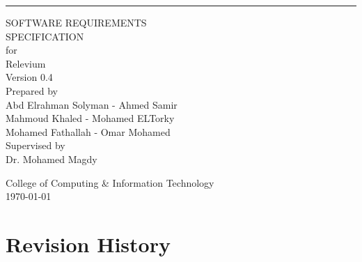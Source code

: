 \documentclass{scrreprt}
\date{\today}
\def\myversion{0.4}
\begin{document}
\begin{flushright}
    \rule{16cm}{5pt}\vskip1cm
    \begin{bfseries}
        \Huge{SOFTWARE REQUIREMENTS\\ SPECIFICATION}\\
        \vspace{1cm}
        for\\
        \vspace{1cm}
        Relevium\\
        \vspace{1cm}
        \LARGE{Version \myversion}\\
        \vspace{1cm}
        Prepared by\\
        Abd Elrahman Solyman - 
        Ahmed Samir \\
        Mahmoud Khaled -
        Mohamed ELTorky \\ 
        Mohamed Fathallah -
        Omar Mohamed\\
        
        \vspace{1cm}
        Supervised by\\
        Dr. Mohamed Magdy

        \vspace{1.2cm}
        College of Computing \& Information Technology\\
        \vspace{1.2cm}
        \today\\
    \end{bfseries}
\end{flushright}

\tableofcontents
\begingroup
\let\clearpage\relax
\listoffigures
\endgroup


\newpage


\chapter*{Revision History}
\end{document}
